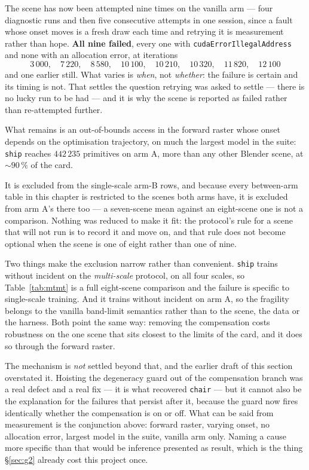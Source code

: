 The scene has now been attempted nine times on the vanilla arm --- four
diagnostic runs and then five consecutive attempts in one session, since a fault
whose onset moves is a fresh draw each time and retrying it is measurement
rather than hope. \textbf{All nine failed}, every one with
\texttt{cudaErrorIllegalAddress} and none with an allocation error, at
iterations
\[
  3\,000,\quad 7\,220,\quad 8\,580,\quad 10\,100,\quad 10\,210,\quad
  10\,320,\quad 11\,820,\quad 12\,100
\]
and one earlier still. What varies is \emph{when}, not \emph{whether}: the
failure is certain and its timing is not. That settles the question retrying was
asked to settle --- there is no lucky run to be had --- and it is why the scene
is reported as failed rather than re-attempted further.

What remains is an out-of-bounds access in the forward raster whose onset
depends on the optimisation trajectory, on much the largest model in the suite:
\texttt{ship} reaches $442\,235$ primitives on arm A, more than any other
Blender scene, at $\sim\!90\,\%$ of the card.

It is excluded from the single-scale arm-B rows, and because every between-arm
table in this chapter is restricted to the scenes both arms have, it is excluded
from arm A's there too --- a seven-scene mean against an eight-scene one is not a
comparison. Nothing was reduced to make it fit: the protocol's rule for a scene
that will not run is to record it and move on, and that rule does not become
optional when the scene is one of eight rather than one of nine.

Two things make the exclusion narrow rather than convenient. \texttt{ship}
trains without incident on the \emph{multi-scale} protocol, on all four scales,
so Table~\ref{tab:mtmt} is a full eight-scene comparison and the failure is
specific to single-scale training. And it trains without incident on arm A, so
the fragility belongs to the vanilla band-limit semantics rather than to the
scene, the data or the harness. Both point the same way: removing the
compensation costs robustness on the one scene that sits closest to the limits of
the card, and it does so through the forward raster.

The mechanism is \emph{not} settled beyond that, and the earlier draft of this
section overstated it. Hoisting the degeneracy guard out of the compensation
branch was a real defect and a real fix --- it is what recovered \texttt{chair}
--- but it cannot also be the explanation for the failures that persist after
it, because the guard now fires identically whether the compensation is on or
off. What can be said from measurement is the conjunction above: forward raster,
varying onset, no allocation error, largest model in the suite, vanilla arm
only. Naming a cause more specific than that would be inference presented as
result, which is the thing \S\ref{sec:g2} already cost this project once.


